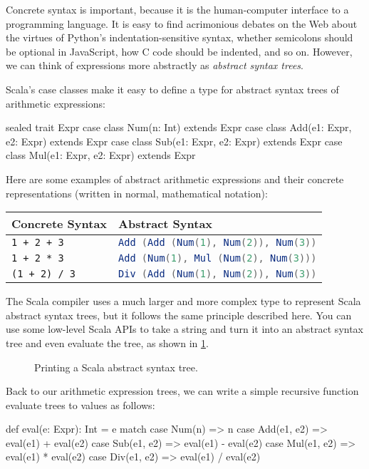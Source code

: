 \documentclass[9pt]{extbook}
\begin{document}
Concrete syntax is important, because it is the human-computer interface to a
programming language. It is easy to find acrimonious debates on the Web about
the virtues of Python's indentation-sensitive syntax, whether semicolons should
be optional in JavaScript, how C code should be indented, and so on. However,
we can think of expressions more abstractly as \emph{abstract syntax trees}.  

Scala's case classes make it easy to define a type for abstract syntax trees
of arithmetic expressions:
%
\begin{scalacode}
sealed trait Expr
case class Num(n: Int) extends Expr
case class Add(e1: Expr, e2: Expr) extends Expr
case class Sub(e1: Expr, e2: Expr) extends Expr
case class Mul(e1: Expr, e2: Expr) extends Expr
\end{scalacode}

Here are some examples of abstract arithmetic expressions and their
concrete representations (written in normal, mathematical notation):

\begin{tabular}{l|l}
Concrete Syntax & Abstract Syntax \\
\hline
\texttt{1 + 2 + 3} & \lstinline[language=scala]|Add (Add (Num(1), Num(2)), Num(3))| \\
\texttt{1 + 2 * 3} & \lstinline[language=scala]|Add (Num(1), Mul (Num(2), Num(3)))| \\
\texttt{(1 + 2) / 3} & \lstinline[language=scala]|Div (Add (Num(1), Num(2)), Num(3))|
\end{tabular}

The Scala compiler uses a much larger and more complex type to represent Scala
abstract syntax trees, but it follows the same principle described here. You can
use some low-level Scala APIs to take a string and turn it into an abstract syntax
tree and even evaluate the tree, as shown in \cref{scala_ast}.

\begin{figure}
  \caption{Printing a Scala abstract syntax tree.}
  \label{scala_ast}
  \end{figure}

Back to our arithmetic expression trees, we can write a simple recursive
function evaluate trees to values as follows:

\begin{scalacode}
def eval(e: Expr): Int = e match {
  case Num(n) => n
  case Add(e1, e2) => eval(e1) + eval(e2)
  case Sub(e1, e2) => eval(e1) - eval(e2)
  case Mul(e1, e2) => eval(e1) * eval(e2)
  case Div(e1, e2) => eval(e1) / eval(e2)
}
\end{scalacode}
\end{document}
